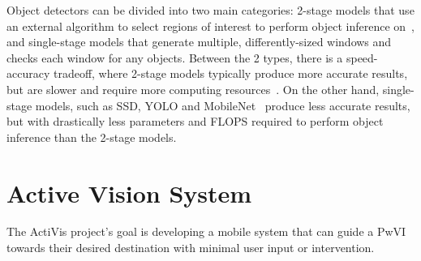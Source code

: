 \documentclass[runningheads]{llncs}
\begin{document}
Object detectors can be divided into two main categories: 2-stage models that use an external algorithm to select regions of interest to perform object inference on~\cite{ren2015faster}, and single-stage models that generate multiple, differently-sized windows and checks each window for any objects.
Between the 2 types, there is a speed-accuracy tradeoff, where 2-stage models typically produce more accurate results, but are slower and require more computing resources~\cite{liu2018deeplf}.
On the other hand, single-stage models, such as SSD, YOLO and MobileNet~\cite{liu2016ssd,redmon2018yolo,howard2017mobilenet} produce less accurate results, but with drastically less parameters and FLOPS required to perform object inference than the 2-stage models. 

\section{Active Vision System}\label{sec:active-vision}

The ActiVis project's goal is developing a mobile system that can guide a PwVI towards their desired destination with minimal user input or intervention. 
\end{document}
